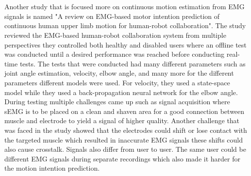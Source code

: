\\\\
Another study that is focused more on continuous motion estimation from EMG signals is named "A review on EMG-based motor intention prediction of continuous human upper limb motion for human-robot collaboration"\cite{continuousemg}.
The study reviewed the EMG-based human-robot collaboration system from multiple perspectives they controlled both healthy and disabled users where an offline test was conducted until a desired performance was reached before conducting
real-time tests. The tests that were conducted had many different parameters such as joint angle estimation, velocity, elbow angle, and many more for the different parameters different models were used. 
For velocity, they used a state-space model while they used a back-propagation neural network for the elbow angle. During testing multiple challenges came up such as signal acquisition where sEMG
is to be placed on a clean and shaven area for a good connection between muscle and electrode to yield a signal of higher quality. Another challenge that was faced in the study showed that the electrodes could shift or lose contact 
with the targeted muscle which resulted in inaccurate EMG signals these shifts could also cause crosstalk. Signals also differ from user to user. The same user could be different EMG signals during separate recordings which also made it 
harder for the motion intention prediction.